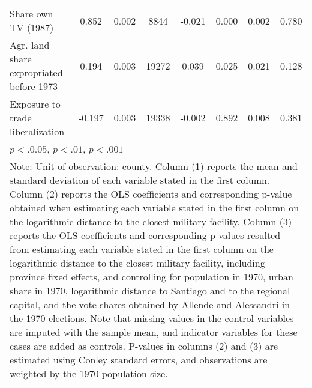 \begin{tabular}{l*{7}{c}}
Share own TV (1987) &     0.852 &     0.002 & 8844 &    -0.021 & 0.000\sym{***} &     0.002 & 0.780  \\
Agr. land share expropriated before 1973 &     0.194 &     0.003 & 19272 &     0.039 & 0.025\sym{*} &     0.021 & 0.128  \\
Exposure to trade liberalization &    -0.197 &     0.003 & 19338 &    -0.002 & 0.892  &     0.008 & 0.381  \\
\hline\hline
\multicolumn{8}{l}{\footnotesize \sym{*} \(p<.0.05\), \sym{**} \(p<.01\), \sym{***} \(p<.001\)}\\
\multicolumn{8}{p{17cm}}{\footnotesize Note: Unit of observation: county. Column (1) reports the mean and standard deviation of each variable stated in the first column. Column (2) reports the OLS coefficients and corresponding p-value obtained when estimating each variable stated in the first column on the logarithmic distance to the closest military facility. Column (3) reports the OLS coefficients and corresponding p-values resulted from estimating each variable stated in the first column on the logarithmic distance to the closest military facility, including province fixed effects, and controlling for population in 1970, urban share in 1970, logarithmic distance to Santiago and to the regional capital, and the vote shares obtained by Allende and Alessandri in the 1970 elections. Note that missing values in the control variables are imputed with the sample mean, and indicator variables for these cases are added as controls. P-values in columns (2) and (3) are estimated using Conley standard errors, and observations are weighted by the 1970 population size.}\\
\end{tabular}
